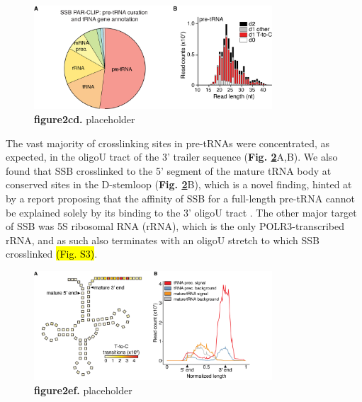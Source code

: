 \documentclass[12pt]{rockefeller}
\begin{document}
\begin{figure}[!ht]%
\centering
\includegraphics[width=3.5in]{paper2cd.png}%
\caption[figure2cd]
{\textbf{figure2cd.}
placeholder}
\centering
\label{paper2cd}%
\end{figure}

The vast majority of crosslinking sites in pre-tRNAs were concentrated, as expected, in the oligoU tract of the 3’ trailer sequence (\textbf{Fig. \ref{paper2ef}}A,B). We also found that SSB crosslinked to the 5’ segment of the mature tRNA body at conserved sites in the D-stemloop (\textbf{Fig. \ref{paper2ef}}B), which is a novel finding, hinted at by a report proposing that the affinity of SSB for a full-length pre-tRNA cannot be explained solely by its binding to the 3’ oligoU tract \cite{Bayfield:2009cx}. The other major target of SSB was 5S ribosomal RNA (rRNA), which is the only POLR3-transcribed rRNA, and as such also terminates with an oligoU stretch to which SSB crosslinked \hl{(Fig. S3)}. 

\begin{figure}[!ht]%
\centering
\includegraphics[width=3.5in]{paper2ef.png}%
\caption[figure2ef]
{\textbf{figure2ef.}
placeholder}
\centering
\label{paper2ef}%
\end{figure}
\end{document}
